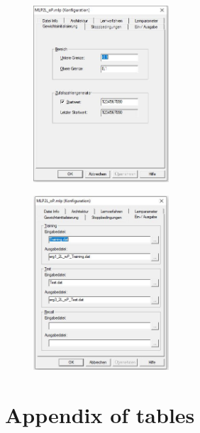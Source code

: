 \documentclass{article}
\begin{document}
\begin{doublespacing}
\begin{appendices}
\begin{figure}[H] 
    \centering
    \includegraphics[width=0.45\textwidth]{Images/Photos/WeightInitializationOP.JPG} 
\end{figure}

\begin{figure}[H] 
    \centering
    \includegraphics[width=0.45\textwidth]{Images/Photos/OutputsOP.JPG} 
\end{figure}



\newpage

\section{Appendix of tables}
\label{appendix:tables}



\end{appendices}
\end{doublespacing}
\end{document}
